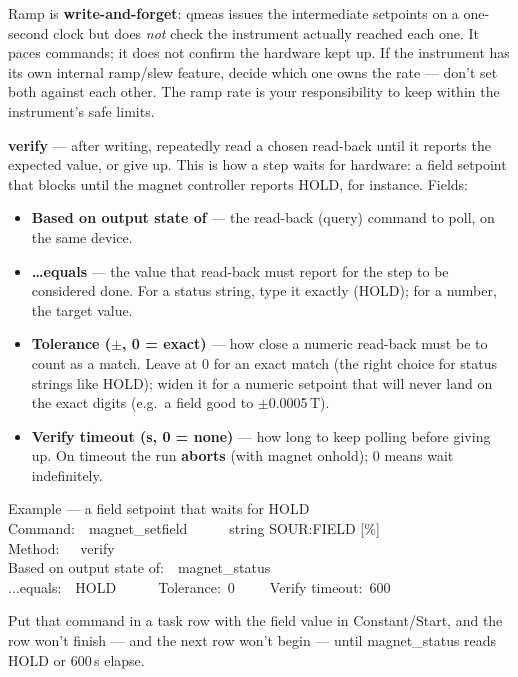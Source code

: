 \documentclass[11pt,a4paper]{article}
\newcommand{\code}[1]{{\ttfamily\color{qcode}#1}}
\begin{document}
\begin{warn}
Ramp is \textbf{write-and-forget}: qmeas issues the intermediate setpoints on
a one-second clock but does \emph{not} check the instrument actually reached
each one. It paces commands; it does not confirm the hardware kept up. If the
instrument has its own internal ramp/slew feature, decide which one owns the
rate --- don't set both against each other. The ramp rate is your
responsibility to keep within the instrument's safe limits.
\end{warn}

\textbf{verify} --- after writing, repeatedly read a chosen read-back until it
reports the expected value, or give up. This is how a step waits for hardware:
a field setpoint that blocks until the magnet controller reports \code{HOLD},
for instance. Fields:

\begin{itemize}
  \item \textbf{Based on output state of} --- the read-back (query) command to
  poll, on the same device.
  \item \textbf{\ldots equals} --- the value that read-back must report for the
  step to be considered done. For a status string, type it exactly
  (\code{HOLD}); for a number, the target value.
  \item \textbf{Tolerance ($\pm$, 0 = exact)} --- how close a numeric read-back
  must be to count as a match. Leave at \code{0} for an exact match (the right
  choice for status strings like \code{HOLD}); widen it for a numeric setpoint
  that will never land on the exact digits (e.g.\ a field good to $\pm$0.0005\,T).
  \item \textbf{Verify timeout (s, 0 = none)} --- how long to keep polling
  before giving up. On timeout the run \textbf{aborts} (with magnet onhold);
  \code{0} means wait indefinitely.
\end{itemize}

\begin{gridex}{Example --- a field setpoint that waits for HOLD}
Command:\ \ magnet\_setfield\ \ \ \ \ \ string  SOUR:FIELD [\%]\\
Method:\ \ \ verify\\
Based on output state of:\ \ magnet\_status\\
...equals:\ \ HOLD\ \ \ \ \ \ Tolerance:\ 0\ \ \ \ \ Verify timeout:\ 600
\end{gridex}

\noindent Put that command in a task row with the field value in
Constant/Start, and the row won't finish --- and the next row won't begin ---
until \code{magnet\_status} reads \code{HOLD} or 600\,s elapse.
\end{document}
